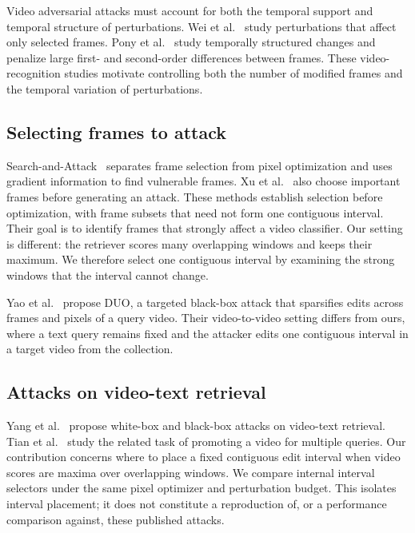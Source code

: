 \documentclass[runningheads]{llncs}
\begin{document}
Video adversarial attacks must account for both the temporal support and temporal structure of perturbations. Wei et al.~\cite{wei2019sparse} study perturbations that affect only selected frames. Pony et al.~\cite{pony2021flickering} study temporally structured changes and penalize large first- and second-order differences between frames. These video-recognition studies motivate controlling both the number of modified frames and the temporal variation of perturbations.

\subsection{Selecting frames to attack}

Search-and-Attack~\cite{heo2021search} separates frame selection from pixel optimization and uses gradient information to find vulnerable frames. Xu et al.~\cite{xu2022keyframe} also choose important frames before generating an attack. These methods establish selection before optimization, with frame subsets that need not form one contiguous interval. Their goal is to identify frames that strongly affect a video classifier. Our setting is different: the retriever scores many overlapping windows and keeps their maximum. We therefore select one contiguous interval by examining the strong windows that the interval cannot change.

Yao et al.~\cite{yao2025duo} propose DUO, a targeted black-box attack that sparsifies edits across frames and pixels of a query video. Their video-to-video setting differs from ours, where a text query remains fixed and the attacker edits one contiguous interval in a target video from the collection.

\subsection{Attacks on video-text retrieval}

Yang et al.~\cite{yang2024vtra} propose white-box and black-box attacks on video-text retrieval. Tian et al.~\cite{tian2025vipro} study the related task of promoting a video for multiple queries. Our contribution concerns where to place a fixed contiguous edit interval when video scores are maxima over overlapping windows. We compare internal interval selectors under the same pixel optimizer and perturbation budget. This isolates interval placement; it does not constitute a reproduction of, or a performance comparison against, these published attacks.
\end{document}
